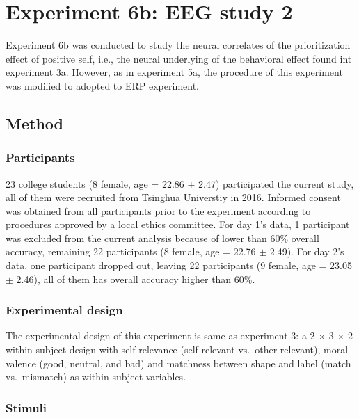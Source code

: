 \documentclass[
  english,
  man]{apa6}
\begin{document}
\hypertarget{experiment-6b-eeg-study-2}{%
\section{Experiment 6b: EEG study 2}\label{experiment-6b-eeg-study-2}}

Experiment 6b was conducted to study the neural correlates of the prioritization effect of positive self, i.e., the neural underlying of the behavioral effect found int experiment 3a. However, as in experiment 5a, the procedure of this experiment was modified to adopted to ERP experiment.

\hypertarget{method-8}{%
\subsection{Method}\label{method-8}}

\hypertarget{participants-10}{%
\subsubsection{Participants}\label{participants-10}}

23 college students (8 female, age = 22.86 \(\pm\) 2.47) participated the current study, all of them were recruited from Tsinghua Universtiy in 2016. Informed consent was obtained from all participants prior to the experiment according to procedures approved by a local ethics committee. For day 1's data, 1 participant was excluded from the current analysis because of lower than 60\% overall accuracy, remaining 22 participants (8 female, age = 22.76 \(\pm\) 2.49). For day 2's data, one participant dropped out, leaving 22 participants (9 female, age = 23.05 \(\pm\) 2.46), all of them has overall accuracy higher than 60\%.

\hypertarget{experimental-design-4}{%
\subsubsection{Experimental design}\label{experimental-design-4}}

The experimental design of this experiment is same as experiment 3: a 2 × 3 × 2 within-subject design with self-relevance (self-relevant vs.~other-relevant), moral valence (good, neutral, and bad) and matchness between shape and label (match vs.~mismatch) as within-subject variables.

\hypertarget{stimuli-5}{%
\subsubsection{Stimuli}\label{stimuli-5}}
\end{document}
